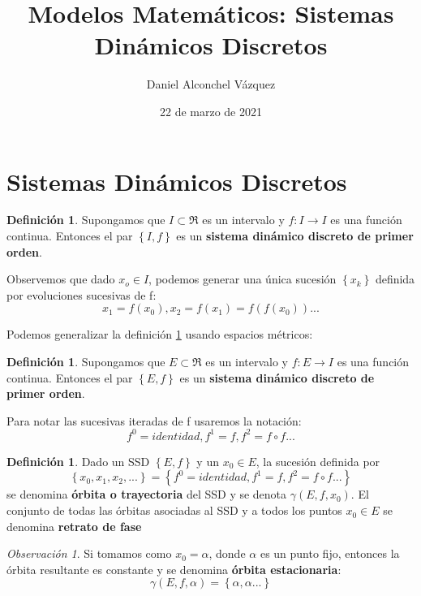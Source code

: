 \documentclass[a4paper, 12pt]{article}
\title{Modelos Matemáticos: Sistemas Dinámicos Discretos}
\author{Daniel Alconchel Vázquez}
\date{22 de marzo de 2021}
\theoremstyle{plain}
\theoremstyle{definition}
\newtheorem{definicion}[teorema]{Definición}
\theoremstyle{remark}
\newtheorem*{observacion}{Observación}
\begin{document}
	\maketitle
	\newpage
	\tableofcontents
	\newpage
	
	\section{Sistemas Dinámicos Discretos}
	\begin{definicion}\label{SDD1}
		Supongamos que \(I \subset \Re\) es un intervalo y \(f:I\rightarrow I\) es una función continua. Entonces el par \(\left\{I,f \right\}\) es un \textbf{sistema dinámico discreto de primer orden}. 
	\end{definicion}
	
	Observemos que dado $ x_o \in I $, podemos generar una única sucesión $\left\{x_k\right\} $ definida por evoluciones sucesivas de f:
	\textcolor{Lila}{\[ x_1=f(x_0), x_2=f(x_1)=f(f(x_0))... \]}
	
	Podemos generalizar la definición \ref{SDD1} usando espacios métricos:
	\begin{definicion}\label{SDD2}
		Supongamos que \(E \subset \Re\) es un intervalo y \(f:E\rightarrow I\) es una función continua. Entonces el par \(\left\{E,f \right\}\) es un \textbf{sistema dinámico discreto de primer orden}. 
	\end{definicion}

	Para notar las sucesivas iteradas de f usaremos la notación:
	\textcolor{Azul}{\[ f^{0}=identidad, f^{1}=f,f^{2}=f\circ f... \]}
	
	\begin{definicion}\label{Orbita}
		Dado un SSD \(\left\{E,f \right\}\) y un $ x_0 \in E $, la sucesión definida por
		\textcolor{Azul}{\[\left\{x_0,x_1,x_2,...\right\} =\left\{f^{0}=identidad, f^{1}=f,f^{2}=f\circ f...\right\} \]}
		se denomina \textbf{órbita o trayectoria} del SSD y se denota $\gamma(E,f,x_0)$.
		El conjunto de todas las órbitas asociadas al SSD y a todos los puntos $ x_0 \in E $ se denomina \textbf{retrato de fase}
	\end{definicion}
	\begin{observacion}\label{Fijo}
		Si tomamos como $x_0 = \alpha$, donde $\alpha$ es un punto fijo, entonces la órbita resultante es constante y se denomina \textbf{órbita estacionaria}:
		\[ \gamma(E,f,\alpha) = \left\{\alpha,\alpha...\right\} \]
	\end{observacion}
\end{document}
